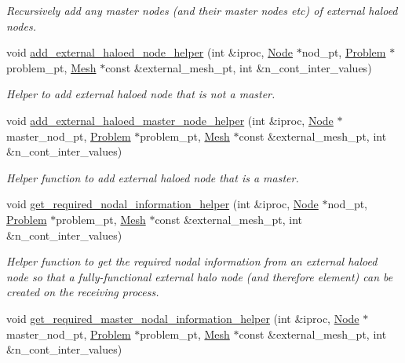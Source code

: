 \begin{DoxyCompactItemize}
\begin{DoxyCompactList}\small\item\em Recursively add any master nodes (and their master nodes etc) of external haloed nodes. \end{DoxyCompactList}\item 
void \hyperlink{namespaceoomph_1_1Multi__domain__functions_aac4036d305c98081e778e16d568ae560}{add\+\_\+external\+\_\+haloed\+\_\+node\+\_\+helper} (int \&iproc, \hyperlink{classoomph_1_1Node}{Node} $\ast$nod\+\_\+pt, \hyperlink{classoomph_1_1Problem}{Problem} $\ast$problem\+\_\+pt, \hyperlink{classoomph_1_1Mesh}{Mesh} $\ast$const \&external\+\_\+mesh\+\_\+pt, int \&n\+\_\+cont\+\_\+inter\+\_\+values)
\begin{DoxyCompactList}\small\item\em Helper to add external haloed node that is not a master. \end{DoxyCompactList}\item 
void \hyperlink{namespaceoomph_1_1Multi__domain__functions_a7116b75de2083297cc1ab4e4b1ca2e48}{add\+\_\+external\+\_\+haloed\+\_\+master\+\_\+node\+\_\+helper} (int \&iproc, \hyperlink{classoomph_1_1Node}{Node} $\ast$master\+\_\+nod\+\_\+pt, \hyperlink{classoomph_1_1Problem}{Problem} $\ast$problem\+\_\+pt, \hyperlink{classoomph_1_1Mesh}{Mesh} $\ast$const \&external\+\_\+mesh\+\_\+pt, int \&n\+\_\+cont\+\_\+inter\+\_\+values)
\begin{DoxyCompactList}\small\item\em Helper function to add external haloed node that is a master. \end{DoxyCompactList}\item 
void \hyperlink{namespaceoomph_1_1Multi__domain__functions_aaf7f6048aab50adfe33d24f8ff9f8390}{get\+\_\+required\+\_\+nodal\+\_\+information\+\_\+helper} (int \&iproc, \hyperlink{classoomph_1_1Node}{Node} $\ast$nod\+\_\+pt, \hyperlink{classoomph_1_1Problem}{Problem} $\ast$problem\+\_\+pt, \hyperlink{classoomph_1_1Mesh}{Mesh} $\ast$const \&external\+\_\+mesh\+\_\+pt, int \&n\+\_\+cont\+\_\+inter\+\_\+values)
\begin{DoxyCompactList}\small\item\em Helper function to get the required nodal information from an external haloed node so that a fully-\/functional external halo node (and therefore element) can be created on the receiving process. \end{DoxyCompactList}\item 
void \hyperlink{namespaceoomph_1_1Multi__domain__functions_a3b08cda68388e72b4159bbc0fa0826ee}{get\+\_\+required\+\_\+master\+\_\+nodal\+\_\+information\+\_\+helper} (int \&iproc, \hyperlink{classoomph_1_1Node}{Node} $\ast$master\+\_\+nod\+\_\+pt, \hyperlink{classoomph_1_1Problem}{Problem} $\ast$problem\+\_\+pt, \hyperlink{classoomph_1_1Mesh}{Mesh} $\ast$const \&external\+\_\+mesh\+\_\+pt, int \&n\+\_\+cont\+\_\+inter\+\_\+values)

\end{DoxyCompactItemize}
